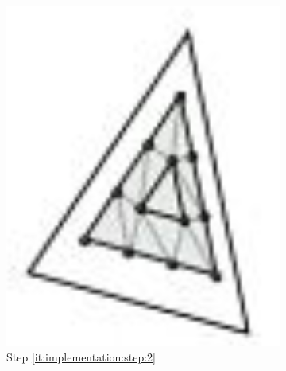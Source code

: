 \begin{figure}
\begin{subfigure}{0.18\columnwidth}
		\includegraphics[width=\textwidth]{content/img/implementation/tessellation_2.png}
		\caption{Step \ref{it:implementation:step:2}}
		\label{fig:implementation:step:2}
	\end{subfigure}		
	\begin{subfigure}{0.18\columnwidth}
		\centering

\end{subfigure}
\end{figure}
